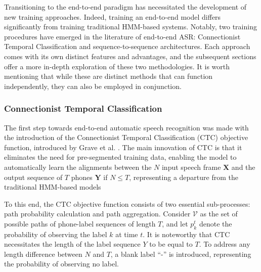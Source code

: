  Transitioning to the end-to-end paradigm has necessitated the development of new training approaches. Indeed, training an end-to-end model differs significantly from training traditional HMM-based systems. Notably, two training procedures have emerged in the literature of end-to-end ASR: Connectionist Temporal Classification and sequence-to-sequence architectures. Each approach comes with its own distinct features and advantages, and the subsequent sections offer a more in-depth exploration of these two methodologies. It is worth mentioning that while these are distinct methods that can function independently, they can also be employed in conjunction.
 
 
 \subsubsection{Connectionist Temporal Classification}
 The first step towards end-to-end automatic speech recognition was made with the introduction of the Connectionist Temporal Classification (CTC) objective function, introduced by Grave et al. \cite{First_End2End}. The main innovation of CTC is that it eliminates the need for pre-segmented training data, enabling the model to automatically learn the alignments between the $N$ input speech frame $\boldsymbol{X}$ and the output sequence of $T$ phones $\boldsymbol{Y}$ if $N \leq T$, representing a departure from the traditional HMM-based models

 To this end, the CTC objective function consists of two essential sub-processes: path probability calculation and path aggregation. Consider $\mathcal{V}$ as the set of possible paths of phone-label sequences of length $T$, and let $p^t_k$ denote the probability of observing the label $k$ at time $t$. It is noteworthy that CTC necessitates the length of the label sequence $Y$ to be equal to $T$. To address any length difference between $N$ and $T$, a blank label ``-'' is introduced, representing the probability of observing no label. 
 
